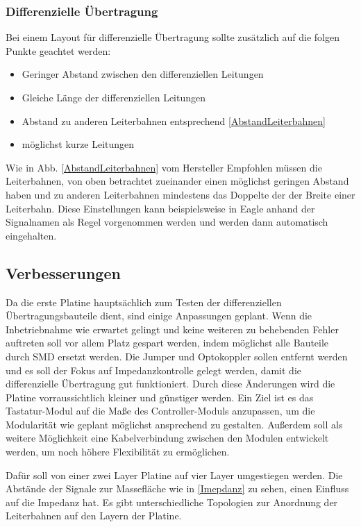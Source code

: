 \subsubsection{Differenzielle Übertragung}
Bei einem Layout für differenzielle Übertragung sollte zusätzlich auf die folgen Punkte geachtet werden:


\begin{itemize}
	\item Geringer Abstand zwischen den differenziellen Leitungen
	\item Gleiche Länge der differenziellen Leitungen
	\item Abstand zu anderen Leiterbahnen entsprechend \ref{AbstandLeiterbahnen}
	\item möglichst kurze Leitungen 
\end{itemize}


Wie in Abb. \ref{AbstandLeiterbahnen} vom Hersteller Empfohlen müssen die Leiterbahnen, von oben betrachtet zueinander einen möglichst geringen Abstand haben und zu anderen Leiterbahnen mindestens das Doppelte der der Breite einer Leiterbahn. Diese Einstellungen kann beispielsweise in Eagle anhand der Signalnamen als Regel vorgenommen werden und werden dann automatisch eingehalten. 

\subsection{Verbesserungen}
Da die erste Platine hauptsächlich zum Testen der differenziellen Übertragungsbauteile dient, sind einige Anpassungen geplant. \newline
Wenn die Inbetriebnahme wie erwartet gelingt und keine weiteren zu behebenden Fehler auftreten soll vor allem Platz gespart werden, indem möglichst alle Bauteile durch SMD ersetzt werden. Die Jumper und Optokoppler sollen entfernt werden und es soll der Fokus auf Impedanzkontrolle gelegt werden, damit die differenzielle Übertragung gut funktioniert. \newline
Durch diese Änderungen wird die Platine vorraussichtlich kleiner und günstiger werden. Ein Ziel ist es das Tastatur-Modul auf die Maße des Controller-Moduls anzupassen, um die Modularität wie geplant möglichst ansprechend zu gestalten. \newline
Außerdem soll als weitere Möglichkeit eine Kabelverbindung zwischen den Modulen entwickelt werden, um noch höhere Flexibilität zu ermöglichen.

Dafür soll von einer zwei Layer Platine auf vier Layer umgestiegen werden. Die Abstände der Signale zur Massefläche wie in \ref{Imepdanz} zu sehen, einen Einfluss auf die Impedanz hat. Es gibt unterschiedliche Topologien zur Anordnung der Leiterbahnen auf den Layern der Platine.

